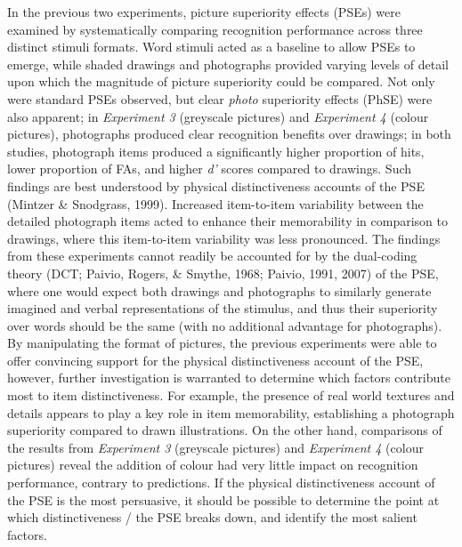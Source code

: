 \documentclass[
  11pt,
]{article}
\begin{document}
In the previous two experiments, picture superiority effects (PSEs) were
examined by systematically comparing recognition performance across
three distinct stimuli formats. Word stimuli acted as a baseline to
allow PSEs to emerge, while shaded drawings and photographs provided
varying levels of detail upon which the magnitude of picture superiority
could be compared. Not only were standard PSEs observed, but clear
\emph{photo} superiority effects (PhSE) were also apparent; in
\emph{Experiment 3} (greyscale pictures) and \emph{Experiment 4} (colour
pictures), photographs produced clear recognition benefits over
drawings; in both studies, photograph items produced a significantly
higher proportion of hits, lower proportion of FAs, and higher \emph{d'}
scores compared to drawings. Such findings are best understood by
physical distinctiveness accounts of the PSE (Mintzer \& Snodgrass,
1999). Increased item-to-item variability between the detailed
photograph items acted to enhance their memorability in comparison to
drawings, where this item-to-item variability was less pronounced. The
findings from these experiments cannot readily be accounted for by the
dual-coding theory (DCT; Paivio, Rogers, \& Smythe, 1968; Paivio, 1991,
2007) of the PSE, where one would expect both drawings and photographs
to similarly generate imagined and verbal representations of the
stimulus, and thus their superiority over words should be the same (with
no additional advantage for photographs). By manipulating the format of
pictures, the previous experiments were able to offer convincing support
for the physical distinctiveness account of the PSE, however, further
investigation is warranted to determine which factors contribute most to
item distinctiveness. For example, the presence of real world textures
and details appears to play a key role in item memorability,
establishing a photograph superiority compared to drawn illustrations.
On the other hand, comparisons of the results from \emph{Experiment 3}
(greyscale pictures) and \emph{Experiment 4} (colour pictures) reveal
the addition of colour had very little impact on recognition
performance, contrary to predictions. If the physical distinctiveness
account of the PSE is the most persuasive, it should be possible to
determine the point at which distinctiveness / the PSE breaks down, and
identify the most salient factors.

~ ~
\end{document}
